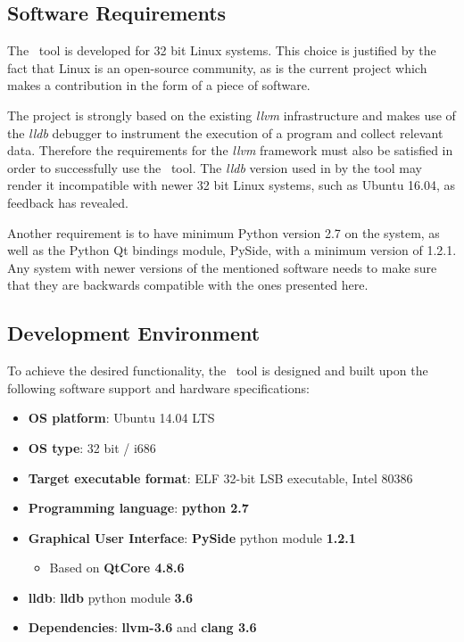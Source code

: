 \subsection{Software Requirements}
\label{sub-sec:software-req}

The \project\ tool is developed for 32 bit Linux systems. This choice is justified by the fact that Linux is an open-source community, as is the current project which makes a contribution in the form of a piece of software. 

The project is strongly based on the existing \textit{llvm} infrastructure and makes use of the \textit{lldb} debugger to instrument the execution of a program and collect relevant data. Therefore the requirements for the \textit{llvm} framework must also be satisfied in order to successfully use the \project\ tool. The \textit{lldb} version used in by the tool may render it incompatible with newer 32 bit Linux systems, such as Ubuntu 16.04, as feedback has revealed.

Another requirement is to have minimum Python version 2.7 on the system, as well as the Python Qt bindings module, PySide, with a minimum version of 1.2.1. Any system with newer versions of the mentioned software needs to make sure that they are backwards compatible with the ones presented here.

\subsection{Development Environment}
\label{sub-sec:develop-envion}

To achieve the desired functionality, the \project\ tool is designed and built upon the following software support and hardware specifications:

\begin{itemize}
\item \textbf{OS platform}: Ubuntu 14.04  LTS
\item \textbf{OS type}: 32 bit / i686
\item \textbf{Target executable format}: ELF 32-bit LSB  executable, Intel 80386
\item \textbf{Programming language}: \textbf{python 2.7}
\item \textbf{Graphical User Interface}: \textbf{PySide} python module \textbf{1.2.1}
\begin{itemize}
\item Based on \textbf{QtCore 4.8.6}
\end{itemize}
\item \textbf{lldb}: \textbf{lldb} python module \textbf{3.6}
\item \textbf{Dependencies}: \textbf{llvm-3.6} and \textbf{clang 3.6}
\end{itemize}

